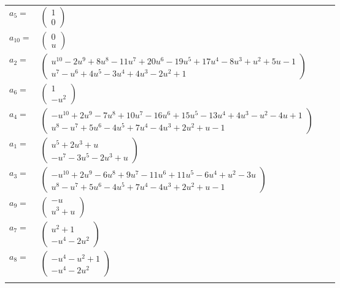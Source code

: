 \documentclass[1p]{elsarticle_modified}
\theoremstyle{definition}
\begin{document}
\begin{tabular}{m{7pt} m{180pt} m{7pt} m{180pt} }
\flushright $a_{5}=$&$\begin{pmatrix}1\\0\end{pmatrix}$ \\
\flushright $a_{10}=$&$\begin{pmatrix}0\\u\end{pmatrix}$ \\
\flushright $a_{2}=$&$\begin{pmatrix}u^{10}-2 u^9+8 u^8-11 u^7+20 u^6-19 u^5+17 u^4-8 u^3+u^2+5 u-1\\u^7- u^6+4 u^5-3 u^4+4 u^3-2 u^2+1\end{pmatrix}$ \\
\flushright $a_{6}=$&$\begin{pmatrix}1\\- u^2\end{pmatrix}$ \\
\flushright $a_{4}=$&$\begin{pmatrix}- u^{10}+2 u^9-7 u^8+10 u^7-16 u^6+15 u^5-13 u^4+4 u^3- u^2-4 u+1\\u^8- u^7+5 u^6-4 u^5+7 u^4-4 u^3+2 u^2+u-1\end{pmatrix}$ \\
\flushright $a_{1}=$&$\begin{pmatrix}u^5+2 u^3+u\\- u^7-3 u^5-2 u^3+u\end{pmatrix}$ \\
\flushright $a_{3}=$&$\begin{pmatrix}- u^{10}+2 u^9-6 u^8+9 u^7-11 u^6+11 u^5-6 u^4+u^2-3 u\\u^8- u^7+5 u^6-4 u^5+7 u^4-4 u^3+2 u^2+u-1\end{pmatrix}$ \\
\flushright $a_{9}=$&$\begin{pmatrix}- u\\u^3+u\end{pmatrix}$ \\
\flushright $a_{7}=$&$\begin{pmatrix}u^2+1\\- u^4-2 u^2\end{pmatrix}$ \\
\flushright $a_{8}=$&$\begin{pmatrix}- u^4- u^2+1\\- u^4-2 u^2\end{pmatrix}$\\&\end{tabular}
\end{document}

